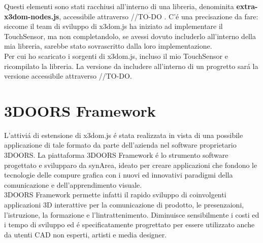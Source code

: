 \documentclass[11pt]{article}
\begin{document}
    Questi elementi sono stati racchiusi all'interno di una libreria, denominita \textbf{extra-x3dom-nodes.js}, accessibile attraverso //TO-DO . 
    C'é una precisazione da fare: siccome il team di sviluppo di x3dom.js ha iniziato ad implementare il TouchSensor, ma non completandolo, se avessi dovuto includerlo all'interno della mia libreria, sarebbe stato sovrascritto dalla loro implementazione. \\
    Per cui ho scaricato i sorgenti di x3dom.js, incluso il mio TouchSensor e ricompilato la libreria. La versione da includere all'interno di un progretto sará la versione accessibile attraverso //TO-DO. \\ 
\clearpage 

\section{3DOORS Framework\texttrademark}
    L'attiviá di estensione di x3dom.js é stata realizzata in vista di una possibile applicazione di tale formato da parte dell'azienda nel software proprietario 3DOORS.
    La piattaforma 3DOORS Framework é lo strumento software progettato e svilupparo da synArea, ideato per creare applicazioni che fondono le tecnologie delle compure grafica con i nuovi ed innovativi paradigmi della comunicazione e dell'apprendimento visuale. \\
    3DOORS Framework permette infatti il rapido sviluppo di coinvolgenti applicazioni 3D interattive per la comunicazione di prodotto, le presenzaioni, l'istruzione, la formazione e l'lintrattenimento. Diminuisce sensibilmente i costi ed i tempo di sviluppo ed é specificatamente progrettato per essere utilizzato anche da utenti CAD non esperti, artisti e media designer. 
\end{document}
